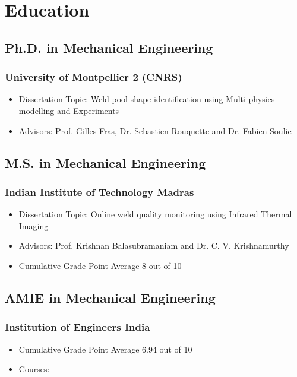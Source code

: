 \documentclass{my_cv}%
\begin{document}
\section{Education}
\vspace{2em}
\subsection{Ph.D. in Mechanical Engineering}
\subsubsection{\faInstitution \hspace{0.2em} University of Montpellier 2 (CNRS)}
\begin{itemize}[leftmargin=0.15in]
\setlength\itemsep{-0.1em}
\color{mygray}
\item Dissertation Topic: Weld pool shape identification using Multi-physics modelling and Experiments
\item Advisors: Prof. Gilles Fras, Dr. Sebastien Rouquette and Dr. Fabien Soulie
\end{itemize}

\subsection{M.S. in Mechanical Engineering}
\subsubsection{\faInstitution \hspace{0.2em} Indian Institute of Technology Madras}
\begin{itemize}[leftmargin=0.15in]
\setlength\itemsep{-0.1em}
\color{mygray}
\item Dissertation Topic: Online weld quality monitoring using Infrared Thermal Imaging
\item Advisors: Prof. Krishnan Balasubramaniam and Dr. C. V. Krishnamurthy
\item Cumulative Grade Point Average 8 out of 10
\end{itemize}

\subsection{AMIE in Mechanical Engineering}
\subsubsection{\faInstitution \hspace{0.2em} Institution of Engineers India}
\begin{itemize}[leftmargin=0.15in]
\setlength\itemsep{-0.1em}
\color{mygray}
\item Cumulative Grade Point Average 6.94 out of 10
\item Courses: 
\end{itemize}
\end{document}
